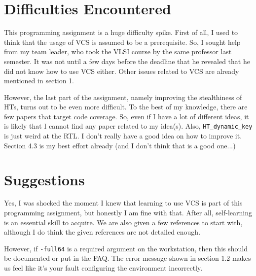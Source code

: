\documentclass{article}
\begin{document}
\section{Difficulties Encountered}

This programming assignment is a huge difficulty spike. First of all, I used to think that the usage of VCS is assumed to be a prerequisite. So, I sought help from my team leader, who took the VLSI course by the same professor last semester. It was not until a few days before the deadline that he revealed that he did not know how to use VCS either. Other issues related to VCS are already mentioned in section 1.

However, the last part of the assignment, namely improving the stealthiness of HTs, turns out to be even more difficult. To the best of my knowledge, there are few papers that target code coverage. So, even if I have a lot of different ideas, it is likely that I cannot find any paper related to my idea(s). Also, \verb|HT_dynamic_key| is just weird at the RTL. I don't really have a good idea on how to improve it. Section 4.3 is my best effort already (and I don't think that is a good one...)

\section{Suggestions}

Yes, I was shocked the moment I knew that learning to use VCS is part of this programming assignment, but honestly I am fine with that. After all, self-learning is an essential skill to acquire. We are also given a few references to start with, although I do think the given references are not detailed enough.

However, if \verb|-full64| is a required argument on the workstation, then this should be documented or put in the FAQ. The error message shown in section 1.2 makes us feel like it's your fault configuring the environment incorrectly.

\printbibliography
\end{document}
